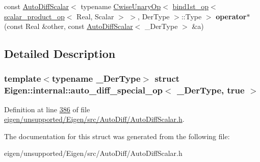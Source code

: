 \begin{DoxyCompactItemize}
\item 
\mbox{\label{struct_eigen_1_1internal_1_1auto__diff__special__op_3_01___der_type_00_01true_01_4_a9c9bcf4a0134ce5840b826c0cf8a574a}} 
const \hyperlink{class_eigen_1_1_auto_diff_scalar}{Auto\+Diff\+Scalar}$<$ typename \hyperlink{group___core___module_class_eigen_1_1_cwise_unary_op}{Cwise\+Unary\+Op}$<$ \hyperlink{struct_eigen_1_1internal_1_1bind1st__op}{bind1st\+\_\+op}$<$ \hyperlink{struct_eigen_1_1internal_1_1scalar__product__op}{scalar\+\_\+product\+\_\+op}$<$ Real, Scalar $>$ $>$, Der\+Type $>$\+::Type $>$ {\bfseries operator$\ast$} (const Real \&other, const \hyperlink{class_eigen_1_1_auto_diff_scalar}{Auto\+Diff\+Scalar}$<$ \+\_\+\+Der\+Type $>$ \&a)
\end{DoxyCompactItemize}


\subsection{Detailed Description}
\subsubsection*{template$<$typename \+\_\+\+Der\+Type$>$\newline
struct Eigen\+::internal\+::auto\+\_\+diff\+\_\+special\+\_\+op$<$ \+\_\+\+Der\+Type, true $>$}



Definition at line \hyperlink{eigen_2unsupported_2_eigen_2src_2_auto_diff_2_auto_diff_scalar_8h_source_l00386}{386} of file \hyperlink{eigen_2unsupported_2_eigen_2src_2_auto_diff_2_auto_diff_scalar_8h_source}{eigen/unsupported/\+Eigen/src/\+Auto\+Diff/\+Auto\+Diff\+Scalar.\+h}.



The documentation for this struct was generated from the following file\+:\begin{DoxyCompactItemize}
\item 
eigen/unsupported/\+Eigen/src/\+Auto\+Diff/\+Auto\+Diff\+Scalar.\+h\end{DoxyCompactItemize}
